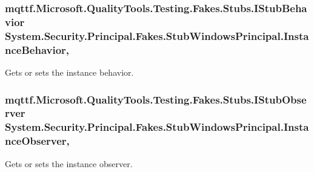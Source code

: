 \hypertarget{class_system_1_1_security_1_1_principal_1_1_fakes_1_1_stub_windows_principal_a5f8dd8ea5ca77fe3c1307eb66d840971}{
\subsubsection[{Instance\-Behavior}]{\setlength{\rightskip}{0pt plus 5cm}mqttf.\-Microsoft.\-Quality\-Tools.\-Testing.\-Fakes.\-Stubs.\-I\-Stub\-Behavior System.\-Security.\-Principal.\-Fakes.\-Stub\-Windows\-Principal.\-Instance\-Behavior\hspace{0.3cm}{\ttfamily [get]}, {\ttfamily [set]}}}\label{class_system_1_1_security_1_1_principal_1_1_fakes_1_1_stub_windows_principal_a5f8dd8ea5ca77fe3c1307eb66d840971}


Gets or sets the instance behavior.

\hypertarget{class_system_1_1_security_1_1_principal_1_1_fakes_1_1_stub_windows_principal_a31273b78f9fc89cea999501da6892264}{
\subsubsection[{Instance\-Observer}]{\setlength{\rightskip}{0pt plus 5cm}mqttf.\-Microsoft.\-Quality\-Tools.\-Testing.\-Fakes.\-Stubs.\-I\-Stub\-Observer System.\-Security.\-Principal.\-Fakes.\-Stub\-Windows\-Principal.\-Instance\-Observer\hspace{0.3cm}{\ttfamily [get]}, {\ttfamily [set]}}}\label{class_system_1_1_security_1_1_principal_1_1_fakes_1_1_stub_windows_principal_a31273b78f9fc89cea999501da6892264}


Gets or sets the instance observer.

